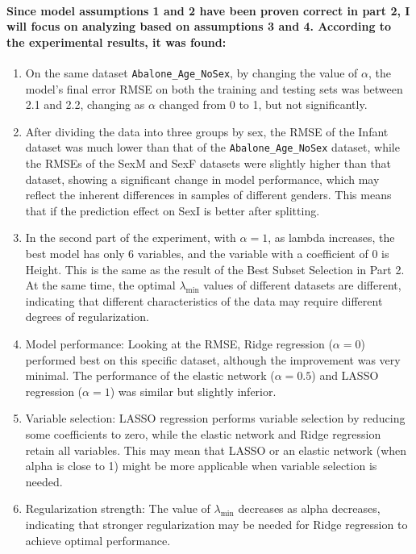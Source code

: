 \documentclass[11pt]{article} %
\begin{document}
\paragraph{Since model assumptions 1 and 2 have been proven correct in part 2, I will focus on analyzing based on assumptions 3 and 4. According to the experimental results, it was found:}
\begin{enumerate}
    \item On the same dataset \texttt{Abalone\_Age\_NoSex}, by changing the value of $\alpha$, the model's final error RMSE on both the training and testing sets was between 2.1 and 2.2, changing as $\alpha$ changed from 0 to 1, but not significantly.
    \item After dividing the data into three groups by sex, the RMSE of the Infant dataset was much lower than that of the \texttt{Abalone\_Age\_NoSex} dataset, while the RMSEs of the SexM and SexF datasets were slightly higher than that dataset, showing a significant change in model performance, which may reflect the inherent differences in samples of different genders. This means that if the prediction effect on SexI is better after splitting.
    \item In the second part of the experiment, with $\alpha=1$, as lambda increases, the best model has only 6 variables, and the variable with a coefficient of 0 is Height. This is the same as the result of the Best Subset Selection in Part 2. At the same time, the optimal $\lambda_{\text{min}}$ values of different datasets are different, indicating that different characteristics of the data may require different degrees of regularization.
    \item Model performance: Looking at the RMSE, Ridge regression ($\alpha=0$) performed best on this specific dataset, although the improvement was very minimal. The performance of the elastic network ($\alpha=0.5$) and LASSO regression ($\alpha=1$) was similar but slightly inferior.
    \item Variable selection: LASSO regression performs variable selection by reducing some coefficients to zero, while the elastic network and Ridge regression retain all variables. This may mean that LASSO or an elastic network (when alpha is close to 1) might be more applicable when variable selection is needed.
    \item Regularization strength: The value of $\lambda_{\text{min}}$ decreases as alpha decreases, indicating that stronger regularization may be needed for Ridge regression to achieve optimal performance.
\end{enumerate}
\end{document}
